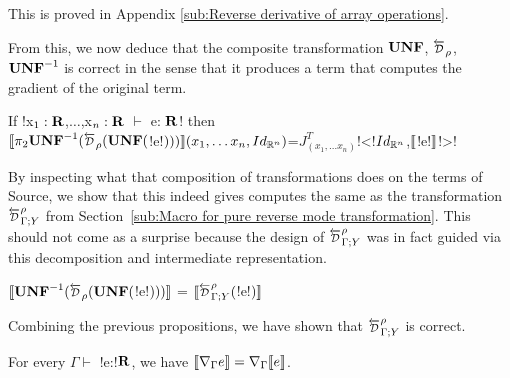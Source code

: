 This is proved in Appendix \ref{sub:Reverse derivative of array operations}.

From this, we now deduce that the composite transformation $\mathbf{UNF}$, $\Dsynrevsymbol_{\rho}$, $\mathbf{UNF}^{-1}$ is correct
in the sense that it produces a term that computes the gradient of the original term.

\begin{proposition}
    If !x$_1:\mathbf{R}$,$\ldots$,x$_n:\mathbf{R}$ $\vdash$ e: $\mathbf{R}$! then \\
    $\seml \pi_2 \UNFSymbol^{-1}(\Dsynrevsymbol_{\rho}(\UNFSymbol($!e!$)))\rrbracket(x_1,\ldots x_n,Id_{\mathbb{R}^n})$=$J^T_{(x_1,\ldots x_n)}$!<!$Id_{\mathbb{R}^n}$,$\llbracket$!e!$\rrbracket$!>!
\end{proposition}

By inspecting what that composition of transformations does on the terms of Source, 
we show that this indeed gives computes the same as the transformation 
$\directD{\rho}{\Gamma}{Y}$ from Section~\ref{sub:Macro for pure reverse mode transformation}. 
This should not come as a surprise because the design of $\directD{\rho}{\Gamma}{Y}$ was in fact guided via 
this decomposition and intermediate representation.

\begin{proposition}
    $\seml\UNFSymbol^{-1}(\Dsynrevsymbol_{\rho}(\UNFSymbol($!e!$)))\rrbracket$ = $\seml\directD{\rho}{\Gamma}{Y}($!e!$)\rrbracket$ 
\end{proposition}

Combining the previous propositions, we have shown that $\directD{\rho}{\Gamma}{Y}$ is correct.

\begin{theorem}
    For every $\Gamma \vdash$ !e:!$\mathbf{R}$, we have 
    $\llbracket \nabla_\Gamma e\rrbracket= \nabla_\Gamma\llbracket e\rrbracket$.
\end{theorem}